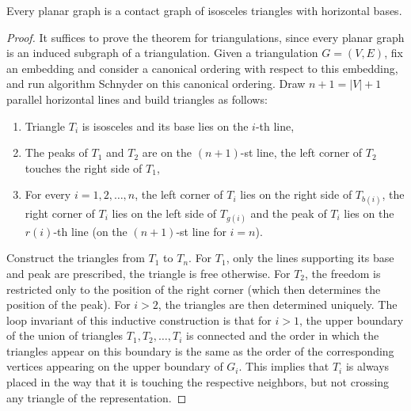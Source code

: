 \begin{thm}
	Every planar graph is a contact graph of isosceles triangles with horizontal bases.
\end{thm}

\begin{proof}
	It suffices to prove the theorem for triangulations, since every planar graph is an induced subgraph of a triangulation. Given a triangulation $G = (V, E)$, fix an embedding and consider a canonical ordering with respect to this embedding, and run algorithm Schnyder on this canonical ordering. Draw $n + 1 = |V| + 1$ parallel horizontal lines and build triangles as follows:
	
	\begin{enumerate}
		\item Triangle $T_i$ is isosceles and its base lies on the $i$-th line,
		\item The peaks of $T_1$ and $T_2$ are on the $(n + 1)$-st line, the left corner of $T_2$ touches the right side of $T_1$,
		\item For every $i = 1, 2, \dots, n$, the left corner of $T_i$ lies on the right side of $T_{b(i)}$, the right corner of $T_i$ lies on the left side of $T_{g(i)}$ and the peak of $T_i$ lies on the $r(i)$-th line (on the $(n + 1)$-st line for $i = n$).
	\end{enumerate}
	
	Construct the triangles from $T_1$ to $T_n$. For $T_1$, only the lines supporting its base and peak are prescribed, the triangle is free otherwise. For $T_2$, the freedom is restricted only to the position of the right corner (which then determines the position of the peak). For $i > 2$, the triangles are then determined uniquely. The loop invariant of this inductive construction is that for $i > 1$, the upper boundary of the union of triangles $T_1 , T_2 , \dots, T_i$ is connected and the order in which the triangles appear on this boundary is the same as the order of the corresponding vertices appearing on the upper boundary of $G_i$. This implies that $T_i$ is always placed in the way that it is touching the respective neighbors, but not crossing any triangle of the representation.
\end{proof}

